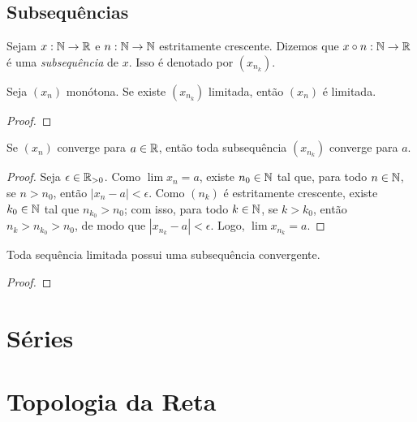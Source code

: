 \subsection{Subsequências}

\begin{definition} \label{defi:subseq}
    Sejam $x : \mathbb{N} \to \mathbb{R}$ e $n : \mathbb{N} \to \mathbb{N}$ estritamente crescente. Dizemos que $x \circ n : \mathbb{N} \to \mathbb{R}$ é uma \emph{subsequência} de $x$. Isso é denotado por $(x_{n_{k}})$.
\end{definition}

\begin{proposition} 
    Seja $(x_n)$ monótona. Se existe $(x_{n_{k}})$ limitada, então $(x_n)$ é limitada.
\end{proposition}

\begin{proof}
    \blackproof
\end{proof}

\begin{proposition} \label{prop.calc1:subseqconv}
    Se $(x_n)$ converge para $a \in \mathbb{R}$, então toda subsequência $(x_{n_{k}})$ converge para $a$.
\end{proposition}

\begin{proof}
    Seja $\epsilon \in \mathbb{R}_{>0}$. Como $\lim x_n = a$, existe $n_0 \in \mathbb{N}$ tal que, para todo $n \in \mathbb{N}$, se $n > n_0$, então $|x_n - a| < \epsilon$. Como $(n_k)$ é estritamente crescente, existe $k_0 \in \mathbb{N}$ tal que $n_{k_0} > n_0$; com isso, para todo $k \in \mathbb{N}$, se $k > k_0$, então $n_k > n_{k_0} > n_0$, de modo que $|x_{n_{k}} - a| < \epsilon$. Logo, $\lim x_{n_{k}} = a$. \blackproof
\end{proof}

\begin{theorem} \label{teo.calc1:bolzanoweierstrass}
    Toda sequência limitada possui uma subsequência convergente.
\end{theorem}

\begin{proof}
    \blackproof
\end{proof}

\section{Séries}

\section{Topologia da Reta}

